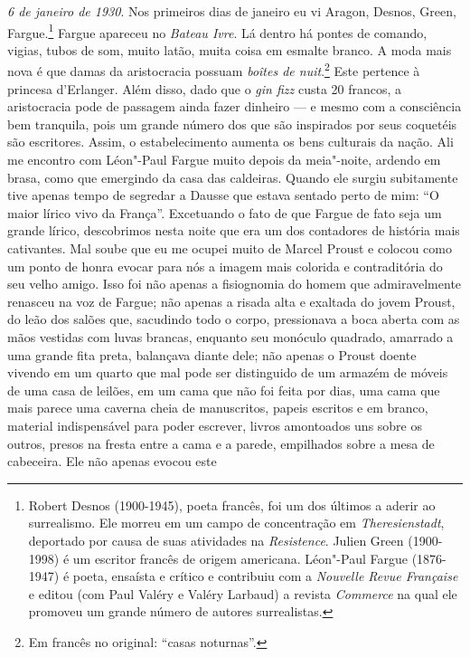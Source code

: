 \emph{6 de janeiro de 1930}. Nos primeiros dias de janeiro eu vi Aragon,
Desnos, Green, Fargue.\footnote{Robert Desnos (1900-1945), poeta
  francês, foi um dos últimos a aderir ao surrealismo. Ele morreu em um
  campo de concentração em \emph{Theresienstadt}, deportado por causa de
  suas atividades na \emph{Resistence}. Julien Green (1900-1998) é um
  escritor francês de origem americana. Léon"-Paul Fargue (1876-1947) é
  poeta, ensaísta e crítico e contribuiu com a \emph{Nouvelle Revue
  Française} e editou (com Paul Valéry e Valéry Larbaud) a revista
  \emph{Commerce} na qual ele promoveu um grande número de autores
  surrealistas. \versal{[N. E.]}} Fargue apareceu no \emph{Bateau Ivre}. Lá dentro há
pontes de comando, vigias, tubos de som, muito latão, muita coisa em
esmalte branco. A moda mais nova é que damas da aristocracia possuam
\emph{boîtes de nuit}.\footnote{Em francês no original: ``casas noturnas''. \versal{[N. T.]}} Este pertence à princesa d'Erlanger. Além disso, dado que
o \emph{gin fizz} custa 20 francos, a aristocracia pode de passagem
ainda fazer dinheiro --- e mesmo com a consciência bem tranquila, pois um
grande número dos que são inspirados por seus coquetéis são escritores.
Assim, o estabelecimento aumenta os bens culturais da nação. Ali me
encontro com Léon"-Paul Fargue muito depois da meia"-noite, ardendo em
brasa, como que emergindo da casa das caldeiras. Quando ele surgiu
subitamente tive apenas tempo de segredar a Dausse que estava sentado
perto de mim: ``O maior lírico vivo da França''. Excetuando o fato de
que Fargue de fato seja um grande lírico, descobrimos nesta noite que
era um dos contadores de história mais cativantes. Mal soube que eu me
ocupei muito de Marcel Proust e colocou como um ponto de honra evocar
para nós a imagem mais colorida e contraditória do seu velho amigo. Isso
foi não apenas a fisiognomia do homem que admiravelmente renasceu na voz
de Fargue; não apenas a risada alta e exaltada do jovem Proust, do leão
dos salões que, sacudindo todo o corpo, pressionava a boca aberta com as
mãos vestidas com luvas brancas, enquanto seu monóculo quadrado,
amarrado a uma grande fita preta, balançava diante dele; não apenas o
Proust doente vivendo em um quarto que mal pode ser distinguido de um
armazém de móveis de uma casa de leilões, em um cama que não foi feita
por dias, uma cama que mais parece uma caverna cheia de manuscritos,
papeis escritos e em branco, material indispensável para poder escrever,
livros amontoados uns sobre os outros, presos na fresta entre a cama e a
parede, empilhados sobre a mesa de cabeceira. Ele não apenas evocou este
